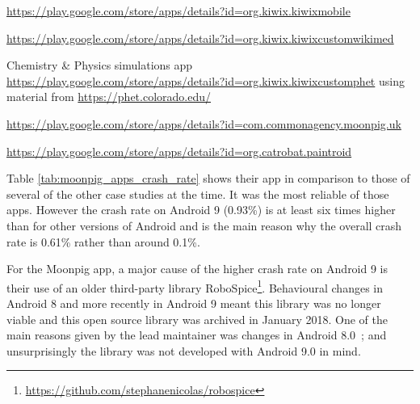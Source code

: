\begin{table}
\begin{threeparttable}
\begin{tablenotes}
\footnotesize
\item [1]\url{https://play.google.com/store/apps/details?id=org.kiwix.kiwixmobile}
\item [2]\url{https://play.google.com/store/apps/details?id=org.kiwix.kiwixcustomwikimed}
\item [3]Chemistry \& Physics simulations app \url{https://play.google.com/store/apps/details?id=org.kiwix.kiwixcustomphet} using material from \url{https://phet.colorado.edu/}  
\item [4]\url{https://play.google.com/store/apps/details?id=com.commonagency.moonpig.uk}
\item [5]\url{https://play.google.com/store/apps/details?id=org.catrobat.paintroid}
\end{tablenotes}
\end{threeparttable}
\end{table}

Table \ref{tab:moonpig_apps_crash_rate} shows their app in comparison to those of several of the other case studies at the time. It was the most reliable of those apps. However the crash rate on Android 9 (0.93\%) is at least six times higher than for other versions of Android and is the main reason why the overall crash rate is 0.61\% rather than around 0.1\%.

For the Moonpig app, a major cause of the higher crash rate on Android 9 is their use of an older third-party library RoboSpice\footnote{\url{https://github.com/stephanenicolas/robospice}}. Behavioural changes in Android 8 and more recently in Android 9 meant this library was no longer viable and this open source library was archived in January 2018. One of the main reasons given by the lead maintainer was changes in Android 8.0~\citep{Robospice01}; and unsurprisingly the library was not developed with Android 9.0 in mind. 

